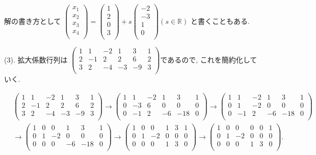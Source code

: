 \documentclass[dvipdfmx,a4paper,11pt]{article}
\newcommand{\R}{\mathbb{R}}
\theoremstyle{definition}
\begin{document}
解の書き方として
$
\begin{pmatrix}
x_1\\
x_2 \\
x_3 \\
x_4 \\
\end{pmatrix}
=
\begin{pmatrix}
1\\
2\\
0 \\
3\\
\end{pmatrix}
+ s
\begin{pmatrix}
-2\\
-3\\
1\\
0 \\
\end{pmatrix}
(s \in \R)
$
と書くこともある.
 
 
  (3).
拡大係数行列は
$
\begin{pmatrix}
1&1&-2&1&3&1\\
2&-1&2&2&6&2\\
3&2&-4&-3&-9&3\\
 \end{pmatrix}
 $であるので, これを簡約化していく.
 
  \begin{align*}
 &\begin{pmatrix}
1&1&-2&1&3&1\\
2&-1&2&2&6&2\\
3&2&-4&-3&-9&3\\
 \end{pmatrix}
 \overset{}{\longrightarrow} 
\begin{pmatrix}
1&1&-2&1&3&1\\
0&-3&6&0&0&0\\
0&-1&2&-6&-18&0\\
 \end{pmatrix}
 \overset{}{\longrightarrow} 
 \begin{pmatrix}
1&1&-2&1&3&1\\
0&1&-2&0&0&0\\
0&-1&2&-6&-18&0\\
 \end{pmatrix}\\
 &\overset{}{\longrightarrow} 
  \begin{pmatrix}
1&0&0&1&3&1\\
0&1&-2&0&0&0\\
0&0&0&-6&-18&0\\
 \end{pmatrix}
 \overset{}{\longrightarrow} 
  \begin{pmatrix}
1&0&0&1&3&1\\
0&1&-2&0&0&0\\
0&0&0&1&3&0\\
 \end{pmatrix}
  \overset{}{\longrightarrow} 
  \begin{pmatrix}
1&0&0&0&0&1\\
0&1&-2&0&0&0\\
0&0&0&1&3&0\\
 \end{pmatrix}.
 \end{align*}
 
\end{document}
